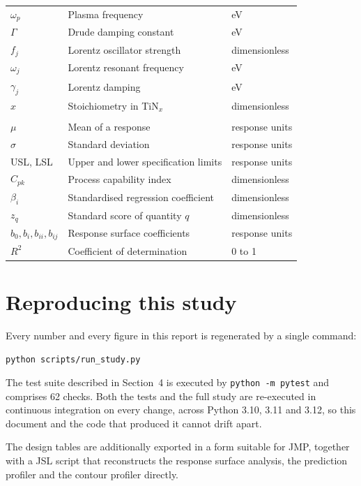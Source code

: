 \documentclass[11pt,a4paper]{article}
\newcommand{\Cpk}{\ensuremath{C_{pk}}}
\begin{document}
\begin{longtable}{@{}p{2.3cm}p{8.6cm}p{3.4cm}@{}}
$\omega_p$ & Plasma frequency & eV \\
$\Gamma$ & Drude damping constant & eV \\
$f_j$ & Lorentz oscillator strength & dimensionless \\
$\omega_j$ & Lorentz resonant frequency & eV \\
$\gamma_j$ & Lorentz damping & eV \\
$x$ & Stoichiometry in TiN$_x$ & dimensionless \\
\addlinespace
\multicolumn{3}{@{}l}{\textit{Statistics}}\\
$\mu$ & Mean of a response & response units \\
$\sigma$ & Standard deviation & response units \\
USL, LSL & Upper and lower specification limits & response units \\
\Cpk & Process capability index & dimensionless \\
$\beta_i$ & Standardised regression coefficient & dimensionless \\
$z_q$ & Standard score of quantity $q$ & dimensionless \\
$b_0, b_i, b_{ii}, b_{ij}$ & Response surface coefficients & response units \\
$R^2$ & Coefficient of determination & 0 to 1 \\
\bottomrule
\end{longtable}

\section{Reproducing this study}

Every number and every figure in this report is regenerated by a single
command:

\begin{center}
\texttt{python scripts/run\_study.py}
\end{center}

The test suite described in Section~4 is executed by \texttt{python -m pytest}
and comprises 62 checks. Both the tests and the full study are re-executed in
continuous integration on every change, across Python 3.10, 3.11 and 3.12, so
this document and the code that produced it cannot drift apart.

The design tables are additionally exported in a form suitable for JMP,
together with a JSL script that reconstructs the response surface analysis, the
prediction profiler and the contour profiler directly.
\end{document}
